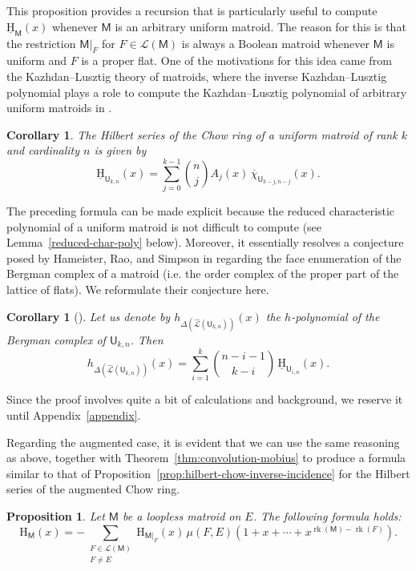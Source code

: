 \documentclass[11pt, a4paper, english]{amsart}
\theoremstyle{teoremas}
\newtheorem{corollary}[theorem]{Corollary}
\newtheorem{proposition}[theorem]{Proposition}
\theoremstyle{definition}
\DeclareMathOperator{\rk}{rk}
\newcommand{\M}{\mathsf{M}}
\newcommand{\U}{\mathsf{U}}
\renewcommand{\H}{\mathrm{H}}
\newcommand{\uH}{\underline{\mathrm{H}}}
\begin{document}
This proposition provides a recursion that is particularly useful to compute $\uH_{\M}(x)$ whenever $\M$ is an arbitrary uniform matroid. The reason for this is that the restriction $\M|_F$ for $F\in\mathcal{L}(\M)$ is always a Boolean matroid whenever $\M$ is uniform and $F$ is a proper flat. One of the motivations for this idea came from the Kazhdan--Lusztig theory of matroids, where the inverse Kazhdan--Lusztig polynomial plays a role to compute the Kazhdan--Lusztig polynomial of arbitrary uniform matroids in \cite[Section 3]{gao-xie}.

\begin{corollary}\label{corollary:uH-uniform}
    The Hilbert series of the Chow ring of a uniform matroid of rank $k$ and cardinality $n$ is given by
    \[ \uH_{\U_{k,n}}(x) = \sum_{j=0}^{k-1} \binom{n}{j} A_{j}(x)\, \overline{\chi}_{\U_{k-j,n-j}}(x).\]
\end{corollary}

The preceding formula can be made explicit because the reduced characteristic polynomial of a uniform matroid is not difficult to compute (see Lemma~\ref{reduced-char-poly} below). Moreover, it essentially resolves a conjecture posed by Hameister, Rao, and Simpson in \cite{hameister-rao-simpson} regarding the face enumeration of the Bergman complex of a matroid (i.e. the order complex of the proper part of the lattice of flats). We reformulate their conjecture here.

\begin{corollary}[{\cite[Conjecture 6.2]{hameister-rao-simpson}}]
    Let us denote by $h_{\Delta(\widehat{\mathcal{L}}(\U_{k,n}))}(x)$ the $h$-polynomial of the Bergman complex of $\U_{k,n}$. Then
    \[ h_{\Delta(\widehat{\mathcal{L}}(\U_{k,n}))}(x) = \sum_{i=1}^k \binom{n-i-1}{k-i}\, \uH_{\U_{i,n}}(x).\]
\end{corollary}

Since the proof involves quite a bit of calculations and  background, we reserve it until Appendix~\ref{appendix}.

Regarding the augmented case, it is evident that we can use the same reasoning as above, together with Theorem~\ref{thm:convolution-mobius} to produce a formula similar to that of Proposition~\ref{prop:hilbert-chow-inverse-incidence} for the Hilbert series of the augmented Chow ring. 

\begin{proposition}\label{prop:hilbert-aug-chow-inverse-incidence}
    Let $\M$ be a loopless matroid on $E$. The following formula holds:
    \[ \H_{\M}(x) = - \sum_{\substack{F\in\mathcal{L}(\M)\\F\neq E}} \H_{\M|_F}(x)\, \mu(F,E) \left(1 + x + \cdots + x^{\rk(\M)-\rk(F)}\right).\]
\end{proposition}
\end{document}
